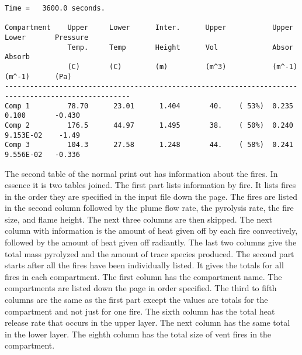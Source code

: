 \begin{lstlisting}[basicstyle=\tiny]
Time =   3600.0 seconds.

Compartment    Upper     Lower      Inter.      Upper           Upper      Lower       Pressure
               Temp.     Temp       Height      Vol             Absor      Absorb
               (C)       (C)        (m)         (m^3)           (m^-1)     (m^-1)      (Pa)
----------------------------------------------------------------------------------------------------
Comp 1         78.70      23.01      1.404       40.    ( 53%)  0.235      0.100       -0.430
Comp 2         176.5      44.97      1.495       38.    ( 50%)  0.240      9.153E-02    -1.49
Comp 3         104.3      27.58      1.248       44.    ( 58%)  0.241      9.556E-02   -0.336
\end{lstlisting}
The second table of the normal print out has information about the fires.  In essence it is two tables joined.  The first part lists information by fire. It lists fires in the order they are specified in the input file down the page.  The fires are listed in the second column followed by the plume flow rate, the pyrolysis rate, the fire size, and flame height.  The next three columns are then skipped.  The next column with information is the amount of heat given off by each fire convectively, followed by the amount of heat given off radiantly. The last two columns give the total mass pyrolyzed and the amount of trace species produced.  The second part starts after all the fires have been individually listed.  It gives the totals for all fires in each compartment.  The first column has the compartment name.  The compartments are listed down the page in order specified.  The third to fifth columns are the same as the first part except the values are totals for the compartment and not just for one fire.  The sixth column has the total heat release rate that occurs in the upper layer.  The next column has the same total in the lower layer.  The eighth column has the total size of vent fires in the compartment.

